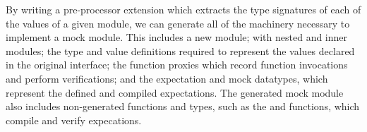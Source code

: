 By writing a pre-processor extension which extracts the type
signatures of each of the values of a given module, we can generate
all of the machinery necessary to implement a mock module. This
includes a new module; with nested  and  inner
modules; the type and value definitions required to represent the
values declared in the original interface; the function proxies which
record function invocations and perform verifications; and the
expectation and mock datatypes, which represent the defined and
compiled expectations. The generated mock module also includes
non-generated functions and types, such as the  and
 functions, which compile and verify expecations.
